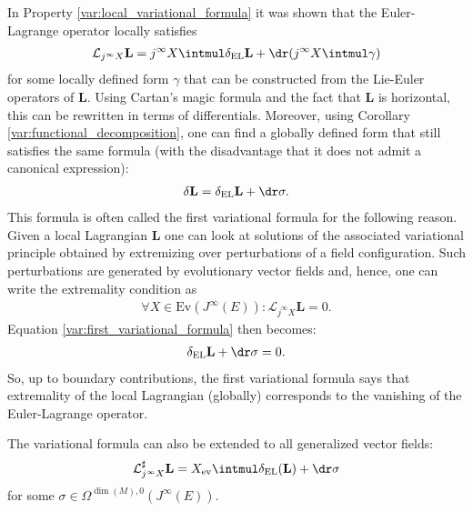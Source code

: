     \begin{property}
        In Property \ref{var:local_variational_formula} it was shown that the Euler-Lagrange operator locally satisfies
        \begin{gather}
            \mathcal{L}_{j^\infty X}\mathbf{L} = j^\infty X\intmul\delta_\mathrm{EL}\mathbf{L} + \dr(j^\infty X\intmul\gamma)
        \end{gather}
        for some locally defined form $\gamma$ that can be constructed from the Lie-Euler operators of $\mathbf{L}$. Using Cartan's magic formula and the fact that $\mathbf{L}$ is horizontal, this can be rewritten in terms of differentials. Moreover, using Corollary \ref{var:functional_decomposition}, one can find a globally defined form that still satisfies the same formula (with the disadvantage that it does not admit a canonical expression):
        \begin{gather}
            \label{var:first_variational_formula}
            \delta\mathbf{L} = \delta_\mathrm{EL}\mathbf{L} + \dr\sigma.
        \end{gather}
        This formula is often called the first variational formula for the following reason. Given a local Lagrangian $\mathbf{L}$ one can look at solutions of the associated variational principle obtained by extremizing over perturbations of a field configuration. Such perturbations are generated by evolutionary vector fields and, hence, one can write the extremality condition as
        \begin{gather}
            \forall X\in\mathrm{Ev}(J^\infty(E)):\mathcal{L}_{j^\infty X}\mathbf{L} = 0.
        \end{gather}
        Equation \eqref{var:first_variational_formula} then becomes:
        \begin{gather}
            \delta_\mathrm{EL}\mathbf{L} + \dr\sigma = 0.
        \end{gather}
        So, up to boundary contributions, the first variational formula says that extremality of the local Lagrangian (globally) corresponds to the vanishing of the Euler-Lagrange operator.
    \end{property}
    \begin{result}\label{var:general_variational_formula}
        The variational formula can also be extended to all generalized vector fields:
        \begin{gather}
            \mathcal{L}^\sharp_{j^\infty X}\mathbf{L} = X_\mathrm{ev}\intmul\delta_\mathrm{EL}(\mathbf{L}) + \dr\sigma
        \end{gather}
        for some $\sigma\in\Omega^{\dim(M),0}(J^\infty(E))$.
    \end{result}

